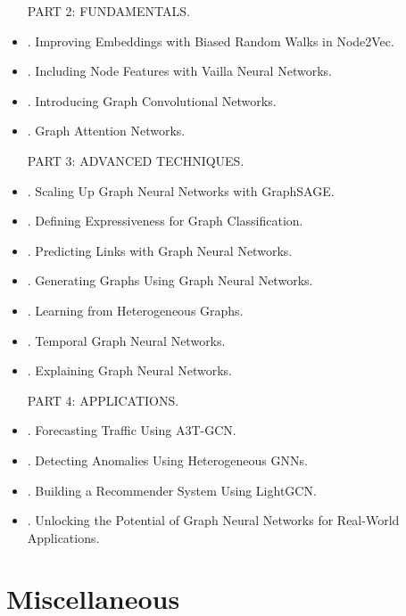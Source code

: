 \documentclass{article}
\begin{document}
\begin{itemize}
    PART 2: FUNDAMENTALS.
    \item {. Improving Embeddings with Biased Random Walks in Node2Vec.}
    \item {. Including Node Features with Vailla Neural Networks.}
    \item {. Introducing Graph Convolutional Networks.}
    \item {. Graph Attention Networks.}

    PART 3: ADVANCED TECHNIQUES.
    \item {. Scaling Up Graph Neural Networks with GraphSAGE.}
    \item {. Defining Expressiveness for Graph Classification.}
    \item {. Predicting Links with Graph Neural Networks.}
    \item {. Generating Graphs Using Graph Neural Networks.}
    \item {. Learning from Heterogeneous Graphs.}
    \item {. Temporal Graph Neural Networks.}
    \item {. Explaining Graph Neural Networks.}

    PART 4: APPLICATIONS.
    \item {. Forecasting Traffic Using A3T-GCN.}
    \item {. Detecting Anomalies Using Heterogeneous GNNs.}
    \item {. Building a Recommender System Using LightGCN.}
    \item {. Unlocking the Potential of Graph Neural Networks for Real-World Applications.}
\end{itemize}


\section{Miscellaneous}


\printbibliography[heading=bibintoc]
\end{document}
